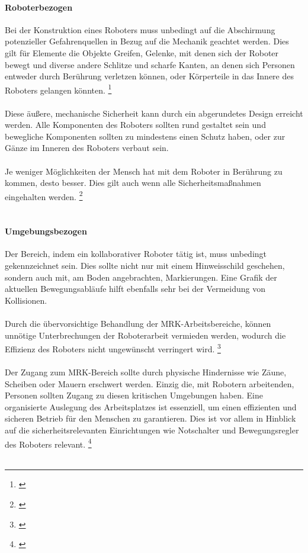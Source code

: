 \documentclass[titlepage,12pt,twoside]{article}
\begin{document}
\paragraph{Roboterbezogen}
\hfill \break
\hfill \break
Bei der Konstruktion eines Roboters muss unbedingt auf die Abschirmung 
potenzieller Gefahrenquellen in Bezug auf die Mechanik geachtet werden. Dies gilt 
für Elemente die Objekte Greifen, Gelenke, mit denen sich der Roboter bewegt und 
diverse andere Schlitze und scharfe Kanten, an denen sich Personen entweder durch 
Berührung verletzen können, oder Körperteile in das Innere des Roboters gelangen 
könnten. \footnote{\cite{Frauenhofer22}} \\
\\
Diese äußere, mechanische Sicherheit kann durch ein abgerundetes Design erreicht 
werden. Alle Komponenten des Roboters sollten rund gestaltet sein und bewegliche 
Komponenten sollten zu mindestens einen Schutz haben, oder zur Gänze im Inneren 
des Roboters verbaut sein. \\
\\
Je weniger Möglichkeiten der Mensch hat mit dem Roboter in Berührung zu kommen, 
desto besser. Dies gilt auch wenn alle Sicherheitsmaßnahmen eingehalten werden. \footnote{\cite{Frauenhofer22}} \\
\\
\paragraph{Umgebungsbezogen}
\hfill \break
\hfill \break
Der Bereich, indem ein kollaborativer Roboter tätig ist, muss unbedingt 
gekennzeichnet sein. Dies sollte nicht nur mit einem Hinweisschild geschehen, 
sondern auch mit, am Boden angebrachten, Markierungen. Eine Grafik der aktuellen 
Bewegungsabläufe hilft ebenfalls sehr bei der Vermeidung von Kollisionen. \\
\\
Durch die übervorsichtige Behandlung der MRK-Arbeitsbereiche, können unnötige 
Unterbrechungen der Roboterarbeit vermieden werden, wodurch die Effizienz des 
Roboters nicht ungewünscht verringert wird. \footnote{\cite{Frauenhofer23}} \\
\\
Der Zugang zum MRK-Bereich sollte durch physische Hindernisse wie Zäune, Scheiben 
oder Mauern erschwert werden. Einzig die, mit Robotern arbeitenden, Personen 
sollten Zugang zu diesen kritischen Umgebungen haben. Eine organisierte Auslegung 
des Arbeitsplatzes ist essenziell, um einen effizienten und sicheren Betrieb für 
den Menschen zu garantieren. Dies ist vor allem in Hinblick auf die 
sicherheitsrelevanten Einrichtungen wie Notschalter und Bewegungsregler des 
Roboters relevant. \footnote{\cite{Frauenhofer23}} \\
\\
\end{document}

